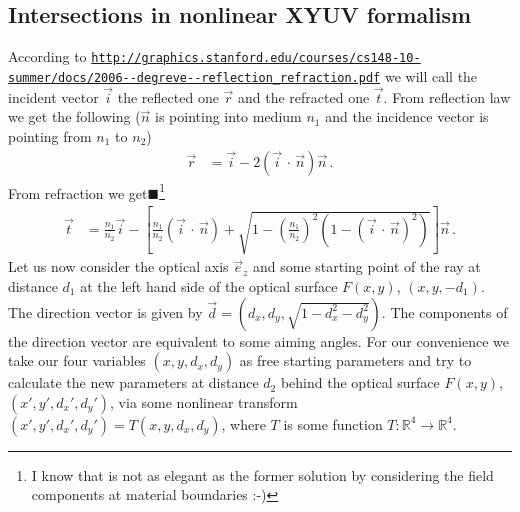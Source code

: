 \documentclass[12pt,a4paper,twoside,openright,BCOR10mm,headsepline,titlepage,abstracton,chapterprefix,final]{scrreprt}
\newcommand{\scpm}[2]{(#1\,\cdot\,#2)}
\newcommand{\remark}[1]{{\color{red}$\blacksquare$}\footnote{{\color{red}#1}}}
\begin{document}
\subsection{Intersections in nonlinear XYUV formalism}
According to {{\tt \url{http://graphics.stanford.edu/courses/cs148-10-summer/docs/2006--degreve--reflection_refraction.pdf}}}
we will call the incident vector $\vec{i}$ the reflected one $\vec{r}$ and the refracted one $\vec{t}$.
From reflection law we get the following ($\vec{n}$ is pointing into medium $n_1$ and the incidence vector is pointing from $n_1$ to $n_2$)
\begin{align}
 \vec{r} &= \vec{i} - 2 \scpm{\vec{i}}{\vec{n}} \vec{n}\,.\label{eq:reflection_vector}
\end{align}
From refraction we get\remark{I know that is not as elegant as the former 
solution by considering the field components at material boundaries :-)}
\begin{align}
 \vec{t} &= \frac{n_1}{n_2} \vec{i} 
 - \left[\frac{n_1}{n_2} \scpm{\vec{i}}{\vec{n}} 
      + \sqrt{1 - \left(\frac{n_1}{n_2}\right)^2 (1 - {\scpm{\vec{i}}{\vec{n}}}^2)}\right] \vec{n}\,.\label{eq:refraction_vector}
\end{align}
Let us now consider the optical axis $\vec{e}_z$ and some starting point of the ray at distance $d_1$ at the left hand side
of the optical surface $F(x, y)$, $(x,y,-d_1)$. The direction vector is given by $\vec{d} = (d_x, d_y, \sqrt{1 - d_x^2 - d_y^2})$.
The components of the direction vector are equivalent to some aiming angles. For our convenience we take our
four variables $(x, y, d_x, d_y)$ as free starting parameters and try to calculate the new parameters at distance $d_2$ behind the
optical surface $F(x, y)$, $(x', y', {d_x}', {d_y}')$, via some nonlinear transform $(x', y', {d_x}', {d_y}') = T(x, y, d_x, d_y)$,
where $T$ is some function $T:\mathbb{R}^4 \to \mathbb{R}^4$.
\end{document}
